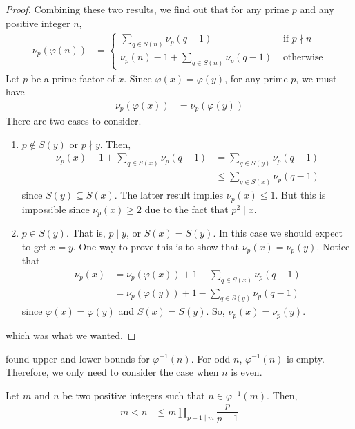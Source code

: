 \begin{proof}
		Combining these two results, we find out that for any prime $p$ and any positive integer $n$,
			\begin{align*}
				\nu_{p}(\varphi(n)) & =
					\begin{cases}
						\sum_{q\in S(n)}\nu_{p}(q-1)&\text{ if }p\nmid n\\
						\nu_{p}(n)-1+\sum_{q\in S(n)}\nu_{p}(q-1)&\text{ otherwise}
					\end{cases}
			\end{align*}
		Let $p$ be a prime factor of $x$. Since $\varphi(x)=\varphi(y)$, for any prime $p$, we must have
			\begin{align*}
				\nu_{p}(\varphi(x)) & = \nu_{p}(\varphi(y))
			\end{align*}
		There are two cases to consider.
			\begin{enumerate}[1.]
				\item $p\notin S(y)$ or $p\nmid y$. Then,
						\begin{align*}
							\nu_{p}(x)-1+\sum_{q\in S(x)}\nu_{p}(q-1) & = \sum_{q\in S(y)}\nu_{p}(q-1)\\
														  & \leq\sum_{q\in S(x)}\nu_{p}(q-1)
						\end{align*}
					since $S(y)\subseteq S(x)$. The latter result implies $\nu_{p}(x) \leq 1$. But this is impossible since $\nu_{p}(x)\geq2$ due to the fact that $p^2\mid x$.
				\item $p\in S(y)$. That is, $p\mid y$, or $S(x)=S(y)$. In this case we should expect to get $x=y$. One way to prove this is to show that $\nu_{p}(x)=\nu_{p}(y)$. Notice that
					\begin{align*}
						\nu_{p}(x) & = \nu_{p}(\varphi(x))+1-\sum_{q\in S(x)} \nu_{p}(q-1)\\
							 & = \nu_{p}(\varphi(y))+1-\sum_{q\in S(y)} \nu_{p}(q-1)
					\end{align*}
				since $\varphi(x)=\varphi(y)$ and $S(x)=S(y)$. So, $\nu_{p}(x)=\nu_{p}(y)$.
			\end{enumerate}
		which was what we wanted.
	\end{proof}

\textcite{gupta_1981} found upper and lower bounds for $\varphi^{-1}(n)$. For odd $n$, $\varphi^{-1}(n)$ is empty. Therefore, we only need to consider the case when $n$ is even.
	\begin{theorem}[Gupta]\label{thm:gupta}
		Let $m$ and $n$ be two positive integers such that $n\in\varphi^{-1}(m)$. Then,
			\begin{align*}
				m < n & \leq m\prod_{p-1\mid m}\dfrac{p}{p-1}
			\end{align*}
	\end{theorem}

